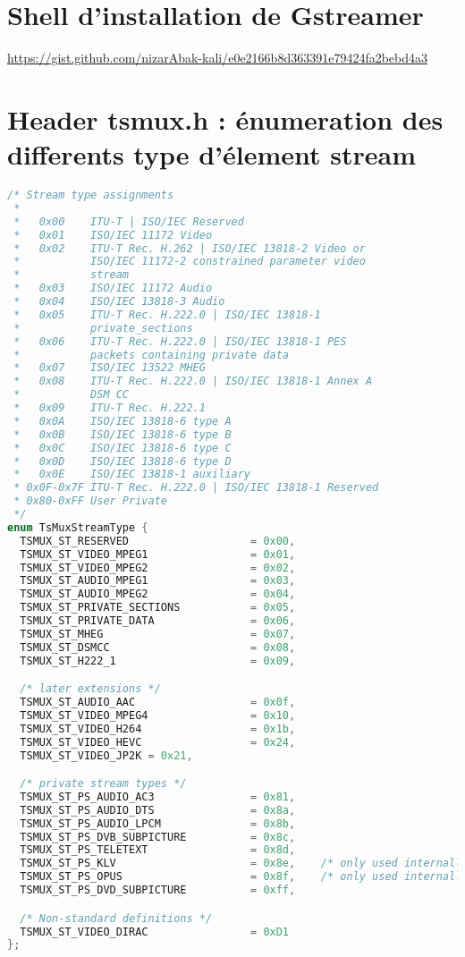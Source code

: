 \appendix
\chapter{Shell d'installation de Gstreamer}

\label{shell_installation_gstreamer}
\url{https://gist.github.com/nizarAbak-kali/e0e2166b8d363391e79424fa2bebd4a3}

\chapter{Header tsmux.h : énumeration des differents type d'élement stream}
\begin{lstlisting}[language=C, caption=extrait du header tsmux.h enumerant les differents types connues,label=tsmux_h]
/* Stream type assignments
 *
 *   0x00    ITU-T | ISO/IEC Reserved
 *   0x01    ISO/IEC 11172 Video
 *   0x02    ITU-T Rec. H.262 | ISO/IEC 13818-2 Video or
 *           ISO/IEC 11172-2 constrained parameter video
 *           stream
 *   0x03    ISO/IEC 11172 Audio
 *   0x04    ISO/IEC 13818-3 Audio
 *   0x05    ITU-T Rec. H.222.0 | ISO/IEC 13818-1
 *           private_sections
 *   0x06    ITU-T Rec. H.222.0 | ISO/IEC 13818-1 PES
 *           packets containing private data
 *   0x07    ISO/IEC 13522 MHEG
 *   0x08    ITU-T Rec. H.222.0 | ISO/IEC 13818-1 Annex A
 *           DSM CC
 *   0x09    ITU-T Rec. H.222.1
 *   0x0A    ISO/IEC 13818-6 type A
 *   0x0B    ISO/IEC 13818-6 type B
 *   0x0C    ISO/IEC 13818-6 type C
 *   0x0D    ISO/IEC 13818-6 type D
 *   0x0E    ISO/IEC 13818-1 auxiliary
 * 0x0F-0x7F ITU-T Rec. H.222.0 | ISO/IEC 13818-1 Reserved
 * 0x80-0xFF User Private
 */
enum TsMuxStreamType {
  TSMUX_ST_RESERVED                   = 0x00,
  TSMUX_ST_VIDEO_MPEG1                = 0x01,
  TSMUX_ST_VIDEO_MPEG2                = 0x02,
  TSMUX_ST_AUDIO_MPEG1                = 0x03,
  TSMUX_ST_AUDIO_MPEG2                = 0x04,
  TSMUX_ST_PRIVATE_SECTIONS           = 0x05,
  TSMUX_ST_PRIVATE_DATA               = 0x06,
  TSMUX_ST_MHEG                       = 0x07,
  TSMUX_ST_DSMCC                      = 0x08,
  TSMUX_ST_H222_1                     = 0x09,

  /* later extensions */
  TSMUX_ST_AUDIO_AAC                  = 0x0f,
  TSMUX_ST_VIDEO_MPEG4                = 0x10,
  TSMUX_ST_VIDEO_H264                 = 0x1b,
  TSMUX_ST_VIDEO_HEVC                 = 0x24,
  TSMUX_ST_VIDEO_JP2K = 0x21,

  /* private stream types */
  TSMUX_ST_PS_AUDIO_AC3               = 0x81,
  TSMUX_ST_PS_AUDIO_DTS               = 0x8a,
  TSMUX_ST_PS_AUDIO_LPCM              = 0x8b,
  TSMUX_ST_PS_DVB_SUBPICTURE          = 0x8c,
  TSMUX_ST_PS_TELETEXT                = 0x8d,
  TSMUX_ST_PS_KLV                     = 0x8e,    /* only used internally */
  TSMUX_ST_PS_OPUS                    = 0x8f,    /* only used internally */
  TSMUX_ST_PS_DVD_SUBPICTURE          = 0xff,

  /* Non-standard definitions */
  TSMUX_ST_VIDEO_DIRAC                = 0xD1
};
\end{lstlisting}